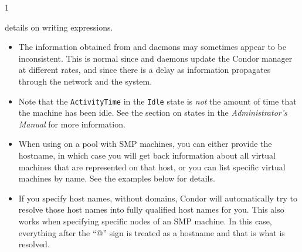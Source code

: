 \begin{ManPage}{\label{man-condor-status}}{1}
\begin{Options}
{		details on writing expressions.}
\end{Options}

\GenRem
\begin{itemize}
	\item The information obtained from  and 
	daemons
	may sometimes appear to be inconsistent.  This is normal since
	  and  daemons update the Condor
	manager at different rates, and since there is a
	delay as information propagates through the network and the system.

	\item Note that the \texttt{ActivityTime} in the \texttt{Idle} state is
	\emph{not} the amount of time that the machine has been idle.  See the
	section on  states in the \emph{Administrator's Manual}
	for more information.

	\item When using  on a pool with SMP machines,
	you can either provide the hostname, in which case you will
	get back information about all virtual machines that are
	represented on that host, or you can list specific virtual
	machines by name.  
	See the examples below for details.

	\item If you specify host names, without domains, Condor will
	automatically try to resolve those host names into fully
	qualified host names for you.
	This also works when specifying specific nodes of an SMP
	machine.
	In this case, everything after the ``@'' sign is treated as a
	hostname and that is what is resolved.


\end{itemize}
\end{ManPage}
